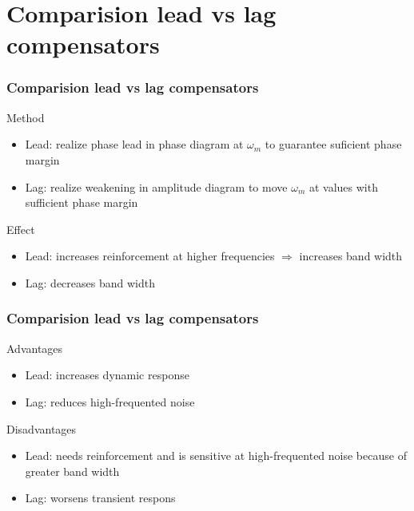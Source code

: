 \section{Comparision lead vs lag compensators}

\begin{frame}
\frametitle{Comparision lead vs lag compensators}
\begin{block}{Method}
\begin{itemize}
\item Lead: realize phase lead in phase diagram at $\omega_m$ to guarantee suficient phase margin
\item Lag: realize weakening in amplitude diagram to move $\omega_m$ at values with sufficient phase margin
\end{itemize}
\end{block}
\begin{block}{Effect}
\begin{itemize}
\item Lead: increases reinforcement at higher frequencies $\Rightarrow$ increases band width
\item Lag: decreases band width
\end{itemize}
\end{block}
\end{frame}

\begin{frame}
\frametitle{Comparision lead vs lag compensators}
\begin{block}{Advantages}
\begin{itemize}
\item Lead: increases dynamic response
\item Lag: reduces high-frequented noise
\end{itemize}
\end{block}
\begin{block}{Disadvantages}
\begin{itemize}
\item Lead: needs reinforcement and is sensitive at high-frequented noise because of greater band width
\item Lag: worsens transient respons
\end{itemize}
\end{block}
\end{frame}

